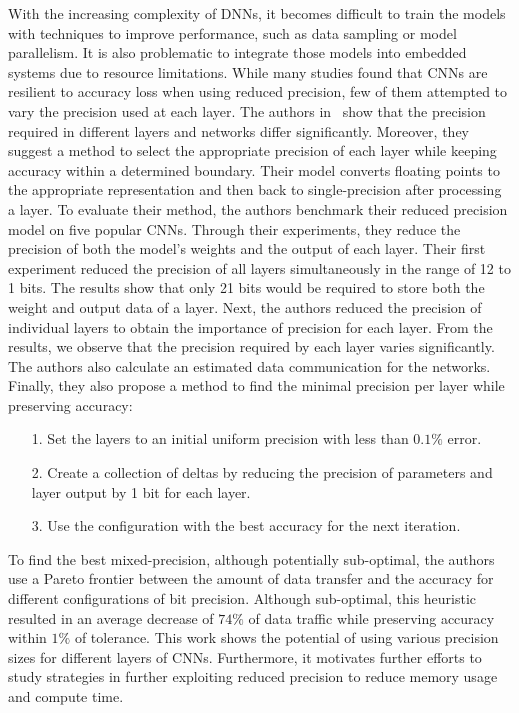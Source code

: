 With the increasing complexity of  DNNs, it becomes difficult to train the models with
techniques to improve performance, such as data sampling or model parallelism.
It is also problematic to integrate those models into embedded systems due to resource limitations.
While many studies found that CNNs are resilient to accuracy loss when using reduced precision,
few of them attempted to vary the precision used at each layer.
The authors in~\cite{Judd2015-kw} show that the precision required in different layers and networks differ significantly.
Moreover, they suggest a method to select the appropriate precision of each layer while
keeping accuracy within a determined boundary.
Their model converts floating points to the appropriate representation and then back to single-precision after processing a layer.
To evaluate their method, the authors benchmark their reduced precision model on five popular CNNs.
Through their experiments, they reduce the precision of both the model's weights and the output of each layer.
Their first experiment reduced the precision of all layers simultaneously in the range of 12 to 1 bits.
The results show that only 21 bits would be required to store both the weight and output data of a layer.
Next, the authors reduced the precision of individual layers to obtain the importance of precision for each layer.
From the results, we observe that the precision required by each layer varies significantly.
The authors also calculate an estimated data communication for the networks.
Finally, they also propose a method to find the minimal precision per layer while preserving accuracy:
\begin{itemize}
	\item[1.] Set the layers to an initial uniform precision with less than $0.1\%$ error.
	\item[2.] Create a collection of deltas by reducing the precision of parameters and layer output by 1 bit for each layer.
	\item[3.] Use the configuration with the best accuracy for the next iteration.
\end{itemize}
To find the best mixed-precision, although potentially sub-optimal, the authors use a Pareto
frontier between the amount of data transfer and the accuracy for different configurations of bit precision.
Although sub-optimal, this heuristic resulted in an average decrease of $74\%$ of data traffic
while preserving accuracy within $1\%$ of tolerance.
This work shows the potential of using various precision sizes for different layers of CNNs.
Furthermore, it motivates further efforts to study strategies in further exploiting reduced precision to reduce memory usage and compute time.

